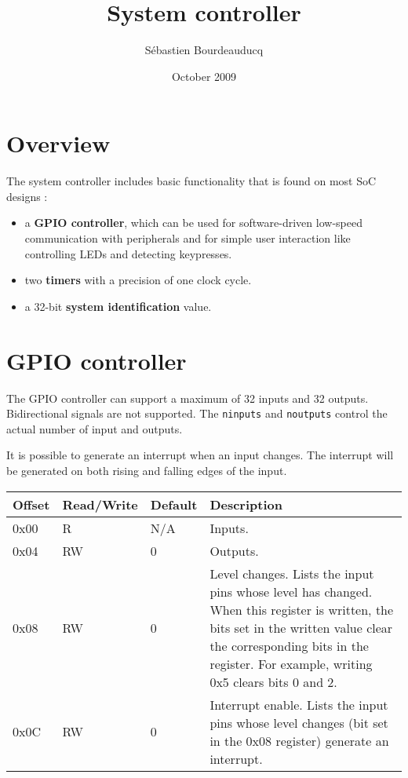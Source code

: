 \documentclass[a4paper,11pt]{article}
\title{System controller}
\author{S\'ebastien Bourdeauducq}
\date{October 2009}
\begin{document}
\setlength{\parindent}{0pt}
\setlength{\parskip}{5pt}
\maketitle{}
\section{Overview}

The system controller includes basic functionality that is found on most SoC designs :
\begin{itemize}
\item a \textbf{GPIO controller}, which can be used for software-driven low-speed communication with peripherals and for simple user interaction like controlling LEDs and detecting keypresses.
\item two \textbf{timers} with a precision of one clock cycle.
\item a 32-bit \textbf{system identification} value.
\end{itemize}

\section{GPIO controller}

The GPIO controller can support a maximum of 32 inputs and 32 outputs. Bidirectional signals are not supported. The \verb!ninputs! and \verb!noutputs! control the actual number of input and outputs.

It is possible to generate an interrupt when an input changes. The interrupt will be generated on both rising and falling edges of the input.

\begin{tabularx}{\textwidth}{|l|l|l|X|}
\hline
\bf{Offset} & \bf{Read/Write} & \bf{Default} & \bf{Description} \\
\hline
0x00 & R & N/A & Inputs. \\
\hline
0x04 & RW & 0 & Outputs. \\
\hline
0x08 & RW & 0 & Level changes. Lists the input pins whose level has changed. When this register is written, the bits set in the written value clear the corresponding bits in the register. For example, writing 0x5 clears bits 0 and 2. \\
\hline
0x0C & RW & 0 & Interrupt enable. Lists the input pins whose level changes (bit set in the 0x08 register) generate an interrupt. \\
\hline
\end{tabularx}\\
\end{document}

